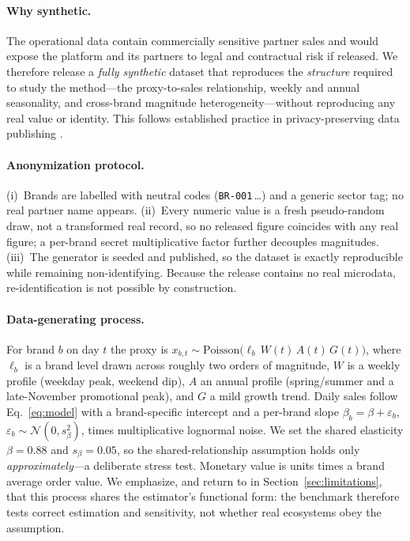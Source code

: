 \documentclass[11pt]{article}
\begin{document}
\paragraph{Why synthetic.}
The operational data contain commercially sensitive partner sales and would
expose the platform and its partners to legal and contractual risk if released.
We therefore release a \emph{fully synthetic} dataset that reproduces the
\emph{structure} required to study the method---the proxy-to-sales relationship,
weekly and annual seasonality, and cross-brand magnitude heterogeneity---without
reproducing any real value or identity. This follows established practice in
privacy-preserving data publishing \citep{Hundepool2012,FigueiraVaz2022,
Hernandez2022}.

\paragraph{Anonymization protocol.}
(i)~Brands are labelled with neutral codes (\texttt{BR-001}\,\dots) and a
generic sector tag; no real partner name appears. (ii)~Every numeric value is a
fresh pseudo-random draw, not a transformed real record, so no released figure
coincides with any real figure; a per-brand secret multiplicative factor further
decouples magnitudes. (iii)~The generator is seeded and published, so the
dataset is exactly reproducible while remaining non-identifying. Because the
release contains no real microdata, re-identification is not possible by
construction.

\paragraph{Data-generating process.}
For brand $b$ on day $t$ the proxy is
$x_{b,t}\sim\mathrm{Poisson}\!\big(\ell_b\,W(t)\,A(t)\,G(t)\big)$, where
$\ell_b$ is a brand level drawn across roughly two orders of magnitude, $W$ is a
weekly profile (weekday peak, weekend dip), $A$ an annual profile (spring/summer
and a late-November promotional peak), and $G$ a mild growth trend. Daily sales
follow Eq.~\eqref{eq:model} with a brand-specific intercept and a per-brand
slope $\beta_b=\beta+\varepsilon_b$, $\varepsilon_b\sim\mathcal{N}(0,s_\beta^2)$,
times multiplicative lognormal noise. We set the shared elasticity $\beta=0.88$
and $s_\beta=0.05$, so the shared-relationship assumption holds only
\emph{approximately}---a deliberate stress test. Monetary value is units times a
brand average order value. We emphasize, and return to in
Section~\ref{sec:limitations}, that this process shares the estimator's
functional form: the benchmark therefore tests correct estimation and
sensitivity, not whether real ecosystems obey the assumption.
\end{document}

